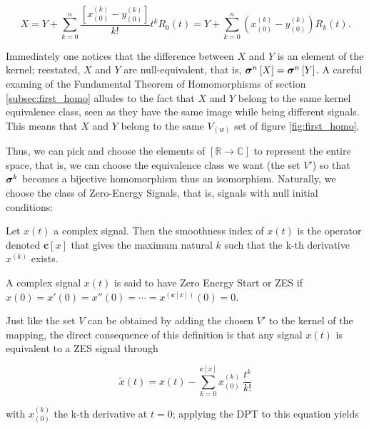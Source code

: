 \begin{equation} X = Y + \sum_{k=0}^{n} \dfrac{\left[x_{(0)}^{(k)} - y_{(0)}^{(k)}\right]}{k!} t^k R_0(t) = Y +\sum_{k=0}^{n} \left(x_{(0)}^{(k)} - y_{(0)}^{(k)}\right)R_k(t) . \label{eq:dp_initial_conds}\end{equation}

	Immediately one notices that the difference between $X$ and $Y$ is an element of the kernel; reestated, $X$ and $Y$ are null-equivalent, that is, $\boldsymbol{\sigma}^{n}\left[X\right] = \boldsymbol{\sigma}^{n}\left[Y\right]$. A careful examing of the Fundamental Theorem of Homomorphisms of section \ref{subsec:first_homo} alludes to the fact that $X$ and $Y$ belong to the same kernel equivalence class, seen as they have the same image while being different signals. This means that $X$ and $Y$ belong to the same $V_{(w)}$ set of figure \ref{fig:first_homo}.

	Thus, we can pick and choose the elements of $\left[\mathbb{R}\to\mathbb{C}\right]$ to represent the entire space, that is, we can choose the equivalence class we want (the set $V'$) so that $\boldsymbol{\sigma}^{k}$ becomes a bijective homomorphism thus an isomorphism. Naturally, we choose the class of Zero-Energy Signals, that is, signals with null initial conditions:

\begin{definition} Let $x(t)$ a complex signal. Then the smoothness index of $x(t)$ is the operator denoted $\mathbf{c}\left[x\right]$ that gives the maximum natural $k$ such that the k-th derivative $x^{(k)}$ exists. \end{definition}

\begin{definition} A complex signal $x(t)$ is said to have Zero Energy Start or ZES if $x(0) = x'(0) = x''(0) = \cdots = x^{\left(\mathbf{c}\left[x\right]\right)}(0) = 0$. \end{definition}

	Just like the set $V$ can be obtained by adding the chosen $V'$ to the kernel of the mapping, the direct consequence of this definition is that any signal $x(t)$ is equivalent to a ZES signal through

\begin{equation} \tilde{x}(t) = x(t) - \sum_{k=0}^{\mathbf{c}\left[x\right]} x^{(k)}_{(0)}\ \dfrac{t^k}{k!} \end{equation}

	\noindent with $x^{(k)}_{(0)}$ the k-th derivative at $t=0$; applying the DPT to this equation yields

